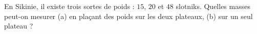 En Sikinie, il existe trois sortes de poids : $15$, $20$ et $48$ slotniks. Quelles masses peut-on mesurer (a) en plaçant des poids sur les deux plateaux, (b) sur un seul plateau ?
